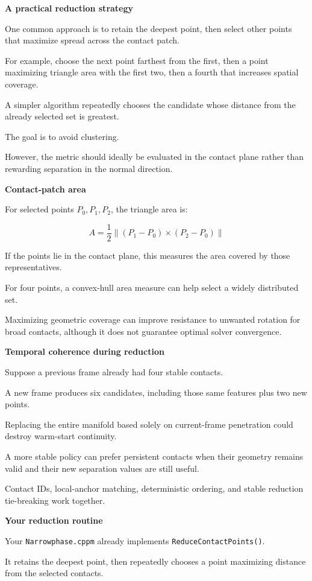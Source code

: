 \textbf{A practical reduction strategy}

One common approach is to retain the deepest point, then select other points that maximize spread across the contact patch.

For example, choose the next point farthest from the first, then a point maximizing triangle area with the first two, then a fourth that increases spatial coverage.

A simpler algorithm repeatedly chooses the candidate whose distance from the already selected set is greatest.

The goal is to avoid clustering.

However, the metric should ideally be evaluated in the contact plane rather than rewarding separation in the normal direction.

\textbf{Contact-patch area}

For selected points \(P_0,P_1,P_2\), the triangle area is:

\[
\boxed{ A=\frac12 \|(P_1-P_0)\times(P_2-P_0)\| }
\]

If the points lie in the contact plane, this measures the area covered by those representatives.

For four points, a convex-hull area measure can help select a widely distributed set.

Maximizing geometric coverage can improve resistance to unwanted rotation for broad contacts, although it does not guarantee optimal solver convergence.

\textbf{Temporal coherence during reduction}

Suppose a previous frame already had four stable contacts.

A new frame produces six candidates, including those same features plus two new points.

Replacing the entire manifold based solely on current-frame penetration could destroy warm-start continuity.

A more stable policy can prefer persistent contacts when their geometry remains valid and their new separation values are still useful.

Contact IDs, local-anchor matching, deterministic ordering, and stable reduction tie-breaking work together.

\textbf{Your reduction routine}

Your \texttt{Narrowphase.cppm} already implements \texttt{ReduceContactPoints()}.

It retains the deepest point, then repeatedly chooses a point maximizing distance from the selected contacts.

